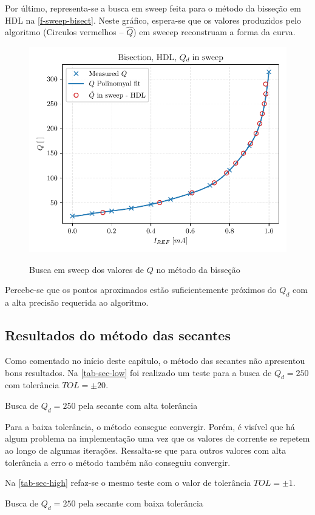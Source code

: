 Por último, representa-se a busca em sweep feita para o método da bisseção em HDL na \autoref{f-sweep-bisect}. Neste gráfico, espera-se que os valores produzidos pelo algoritmo (Circulos vermelhos -- $\hat{Q}$) em sweeep reconstruam a forma da curva.

\begin{figure}[H]
    \centering
    \caption{Busca em sweep dos valores de $Q$ no método da bisseção}
    \includegraphics[width=.5\textwidth]{fig/res-bisect-sweep-hdl.pdf}
    \label{f-sweep-bisect}
\end{figure}

Percebe-se que os pontos aproximados estão suficientemente próximos do $Q_d$ com a alta precisão requerida ao algoritmo.

\subsection{Resultados do método das secantes}

Como comentado no início deste capítulo, o método das secantes não apresentou bons resultados. Na \autoref{tab-sec-low} foi realizado um teste para a busca de $Q_d = 250$ com tolerância $TOL = \pm 20$. 

\begin{table}[H]
    \centering
    \caption{Busca de $Q_d = 250$ pela secante com alta tolerância}
    
    \label{tab-sec-low}
\end{table}

Para a baixa tolerância, o método consegue convergir. Porém, é visível que há algum problema na implementação uma vez que os valores de corrente se repetem ao longo de algumas iterações. Ressalta-se que para outros valores com alta tolerância a erro o método também não conseguiu convergir.

Na \autoref{tab-sec-high} refaz-se o mesmo teste com o valor de tolerância $TOL = \pm 1$.

\begin{table}[H]
    \centering
    \caption{Busca de $Q_d = 250$ pela secante com baixa tolerância}
    
    \label{tab-sec-high}
\end{table}


